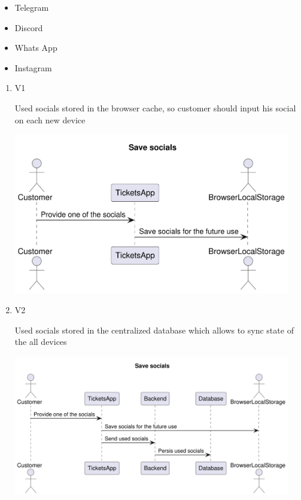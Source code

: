 \documentclass[11pt]{article}
\begin{document}
\begin{itemize}
\item Telegram
\item Discord
\item Whats App
\item Instagram
\end{itemize}
\begin{enumerate}
\item V1
\label{sec:org35c2edf}

Used socials stored in the browser cache, so customer should input his social on each new device

\begin{center}
\includegraphics[width=0.95\textwidth]{./img/v1-save-socials.png}
\label{orge47d8e3}
\end{center}
\item V2
\label{sec:org9fe825c}

Used socials stored in the centralized database which allows to sync state of the all devices

\begin{center}
\includegraphics[width=0.95\textwidth]{./img/v2-save-socials.png}
\label{org7c6f8b3}
\end{center}
\end{enumerate}
\end{document}
